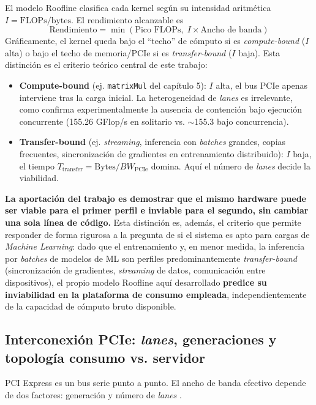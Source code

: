 El modelo Roofline \cite{williams2009roofline} clasifica cada kernel según su intensidad aritmética $I = \text{FLOPs}/\text{bytes}$. El rendimiento alcanzable es
\begin{equation}
\text{Rendimiento} = \min(\text{Pico FLOPs},\; I \times \text{Ancho de banda})
\end{equation}
Gráficamente, el kernel queda bajo el ``techo'' de cómputo si es \textit{compute-bound} ($I$ alta) o bajo el techo de memoria/PCIe si es \textit{transfer-bound} ($I$ baja). Esta distinción es el criterio teórico central de este trabajo:
\begin{itemize}
    \item \textbf{Compute-bound} (ej. \texttt{matrixMul} del capítulo 5): $I$ alta, el bus PCIe apenas interviene tras la carga inicial. La heterogeneidad de \textit{lanes} es irrelevante, como confirma experimentalmente la ausencia de contención bajo ejecución concurrente (155.26 GFlop/s en solitario vs. $\sim$155.3 bajo concurrencia).
    \item \textbf{Transfer-bound} (ej. \textit{streaming}, inferencia con \textit{batches} grandes, copias frecuentes, sincronización de gradientes en entrenamiento distribuido): $I$ baja, el tiempo $T_{\text{transfer}} = \text{Bytes}/BW_{\text{PCIe}}$ domina. Aquí el número de \textit{lanes} decide la viabilidad.
\end{itemize}
\textbf{La aportación del trabajo es demostrar que el mismo hardware puede ser viable para el primer perfil e inviable para el segundo, sin cambiar una sola línea de código.} Esta distinción es, además, el criterio que permite responder de forma rigurosa a la pregunta de si el sistema es apto para cargas de \textit{Machine Learning}: dado que el entrenamiento y, en menor medida, la inferencia por \textit{batches} de modelos de ML son perfiles predominantemente \textit{transfer-bound} (sincronización de gradientes, \textit{streaming} de datos, comunicación entre dispositivos), el propio modelo Roofline aquí desarrollado \textbf{predice su inviabilidad en la plataforma de consumo empleada}, independientemente de la capacidad de cómputo bruto disponible.

\subsection{Interconexión PCIe: \textit{lanes}, generaciones y topología consumo vs. servidor} \label{sec:pcie_lanes}

PCI Express es un bus serie punto a punto. El ancho de banda efectivo depende de dos factores: generación y número de \textit{lanes} \cite{pcisig2022,pci_express_wiki}.

